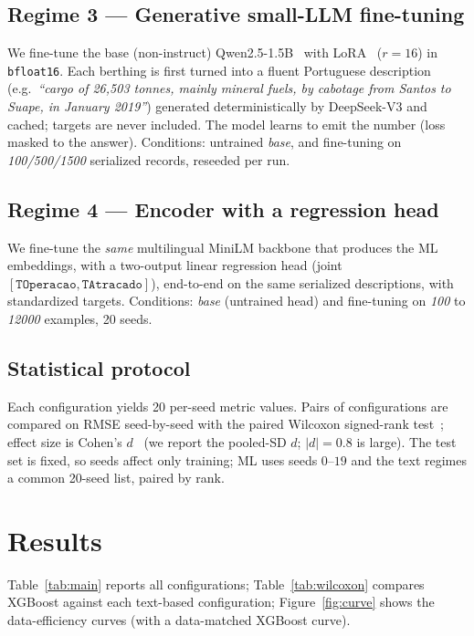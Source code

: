 \documentclass[kdmile,a4paper]{kdmile}
\begin{document}
\subsection{Regime 3 --- Generative small-LLM fine-tuning}
We fine-tune the base (non-instruct) Qwen2.5-1.5B~\cite{qwen2025} with LoRA~\cite{hu2022lora} ($r{=}16$) in \texttt{bfloat16}. Each berthing is first turned into a fluent Portuguese description (e.g.\ \emph{``cargo of 26{,}503 tonnes, mainly mineral fuels, by cabotage from Santos to Suape, in January 2019''}) generated deterministically by DeepSeek-V3 and cached; targets are never included. The model learns to emit the number (loss masked to the answer). Conditions: untrained \emph{base}, and fine-tuning on \emph{100/500/1500} serialized records, reseeded per run.

\subsection{Regime 4 --- Encoder with a regression head}
We fine-tune the \emph{same} multilingual MiniLM backbone that produces the ML embeddings, with a two-output linear regression head (joint $[\texttt{TOperacao},\texttt{TAtracado}]$), end-to-end on the same serialized descriptions, with standardized targets. Conditions: \emph{base} (untrained head) and fine-tuning on \emph{100} to \emph{12000} examples, 20 seeds.

\subsection{Statistical protocol}
Each configuration yields 20 per-seed metric values. Pairs of configurations are compared on RMSE seed-by-seed with the paired Wilcoxon signed-rank test~\cite{wilcoxon1945}; effect size is Cohen's $d$~\cite{cohen1988} (we report the pooled-SD $d$; $|d|{=}0.8$ is large). The test set is fixed, so seeds affect only training; ML uses seeds $0$--$19$ and the text regimes a common 20-seed list, paired by rank.

\section{Results}
\label{sec:results}
Table~\ref{tab:main} reports all configurations; Table~\ref{tab:wilcoxon} compares XGBoost against each text-based configuration; Figure~\ref{fig:curve} shows the data-efficiency curves (with a data-matched XGBoost curve).
\end{document}
